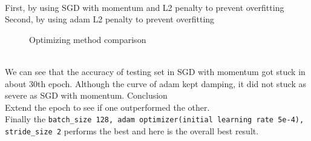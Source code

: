 \documentclass[11pt, a4paper]{article} %
\begin{document}
\\ First, by using SGD with momentum and L2 penalty to prevent overfitting
\\ Second, by using adam L2 penalty to prevent overfitting
\begin{figure}[H]
    \centering
    \hfill
    \caption{Optimizing method comparison}
    \label{fig:my_label}
\end{figure}
\\ We can see that the accuracy of testing set in SGD with momentum got stuck in about 30th epoch. Although the curve of adam kept damping, it did not stuck as severe as SGD with momentum. \newline \break 
{\Large Conclusion}
\\ Extend the epoch to see if one outperformed the other.
\\ Finally the \texttt{batch\_size 128, adam optimizer(initial learning rate 5e-4), stride\_size 2} performs the best and here is the overall best result. 
\end{document}
